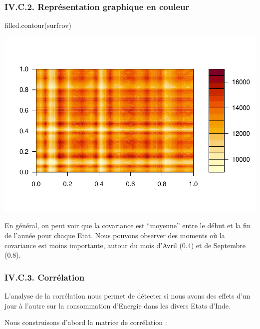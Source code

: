 \documentclass[
]{article}
\newenvironment{Shaded}{\begin{snugshade}}{\end{snugshade}}
\newcommand{\AttributeTok}[1]{\textcolor[rgb]{0.77,0.63,0.00}{#1}}
\newcommand{\CommentTok}[1]{\textcolor[rgb]{0.56,0.35,0.01}{\textit{#1}}}
\newcommand{\DecValTok}[1]{\textcolor[rgb]{0.00,0.00,0.81}{#1}}
\newcommand{\FunctionTok}[1]{\textcolor[rgb]{0.00,0.00,0.00}{#1}}
\newcommand{\NormalTok}[1]{#1}
\newcommand{\OtherTok}[1]{\textcolor[rgb]{0.56,0.35,0.01}{#1}}
\newcommand{\SpecialCharTok}[1]{\textcolor[rgb]{0.00,0.00,0.00}{#1}}
\begin{document}
\hypertarget{iv.c.2.-repruxe9sentation-graphique-en-couleur}{%
\subsubsection{IV.C.2. Représentation graphique en
couleur}\label{iv.c.2.-repruxe9sentation-graphique-en-couleur}}

\begin{Shaded}
\begin{Highlighting}[]
\FunctionTok{filled.contour}\NormalTok{(surfcov)}
\end{Highlighting}
\end{Shaded}

\includegraphics{Projet_CHESNAIS_GUIBERT_files/figure-latex/unnamed-chunk-40-1.pdf}

En général, on peut voir que la covariance est ``moyenne'' entre le
début et la fin de l'année pour chaque Etat. Nous pouvons observer des
moments où la covariance est moins importante, autour du mois d'Avril
(0.4) et de Septembre (0.8).

\hypertarget{iv.c.3.-corruxe9lation}{%
\subsubsection{IV.C.3. Corrélation}\label{iv.c.3.-corruxe9lation}}

L'analyse de la corrélation nous permet de détecter si nous avons des
effets d'un jour à l'autre sur la consommation d'Energie dans les divers
Etats d'Inde.

Nous construisons d'abord la matrice de corrélation :

\begin{Shaded}
\end{Shaded}
\end{document}
